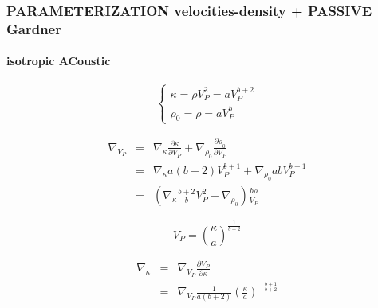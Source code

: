 \documentclass[9pt]{beamer}
\newcommand{\partderi}[2]{\frac{\partial#1}{\partial#2}}
\begin{document}
\begin{frame}\frametitle{PARAMETERIZATION velocities-density + PASSIVE Gardner}
\framesubtitle{isotropic ACoustic}

  \begin{center}
  \end{center}

  \begin{minipage}{0.5\linewidth}
    \[\left\{ \begin{array}{l}
      \kappa = \rho V_P^2 = a V_P^{b+2} \\
      \rho_0 = \rho = a V_P ^{b}
    \end{array} \right.\]
    
    \begin{eqnarray}
      \nabla_{V_P} &=& \nabla_{\kappa} \partderi{\kappa}{V_P} + \nabla_{\rho_0} \partderi{\rho_0}{V_P} \nonumber\\
                   &=& \nabla_{\kappa} a(b+2) V_P^{b+1} + \nabla_{\rho_0} ab V_P^{b-1} \nonumber\\
                   &=& \left( \nabla_{\kappa} \frac{b+2}{b} V_P^2 + \nabla_{\rho_0} \right) \frac{b\rho}{V_P} \nonumber
    \end{eqnarray}

  \end{minipage} \vline
  \begin{minipage}{0.45\linewidth}
    \[ V_P = \left(\frac{\kappa}{a}\right)^{\frac{1}{b+2}} \]
    
    \begin{eqnarray}
      \nabla_{\kappa} &=& \nabla_{V_P} \partderi{V_P}{\kappa} \nonumber\\
                      &=& \nabla_{V_P} \frac{1}{a(b+2)} \left(\frac{\kappa}{a}\right)^{-\frac{b+1}{b+2}} \nonumber
    \end{eqnarray}
  \end{minipage}

\end{frame}
\end{document}
